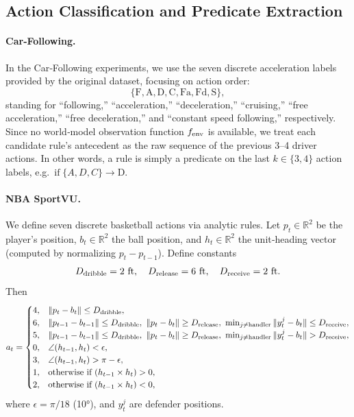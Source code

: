 \documentclass{article} %
\begin{document}
\subsection{Action Classification and Predicate Extraction}
\label{sec:action classification}
\paragraph{Car‐Following.}  
In the Car‐Following experiments, we use the seven discrete acceleration labels provided by the original dataset, focusing on action order:  
\[
\{\mathrm{F},\mathrm{A},\mathrm{D},\mathrm{C},\mathrm{Fa},\mathrm{Fd},\mathrm{S}\},
\]  
standing for “following,” “acceleration,” “deceleration,” “cruising,” “free acceleration,” “free deceleration,” and “constant speed following,” respectively.  Since no world‐model observation function \(f_{\rm env}\) is available, we treat each candidate rule’s antecedent as the raw sequence of the previous 3–4 driver actions.  In other words, a rule is simply a predicate on the last \(k\in\{3,4\}\) action labels, e.g.\ \(\mathrm{if}\;\{A,D,C\}\to\mathrm{D}\).

\paragraph{NBA SportVU.}  
We define seven discrete basketball actions via analytic rules. Let $p_t\in\mathbb R^2$ be the player’s position, $b_t\in\mathbb R^2$ the ball position, and $h_t\in\mathbb R^2$ the unit‐heading vector (computed by normalizing $p_t-p_{t-1}$). Define constants
\[
D_{\rm dribble}=2\text{ ft},\quad
D_{\rm release}=6\text{ ft},\quad
D_{\rm receive}=2\text{ ft}.
\]
Then
\[
a_t = 
\begin{cases}
4,& \|p_t - b_t\|\le D_{\rm dribble},\\
6,& \|p_{t-1}-b_{t-1}\|\le D_{\rm dribble},\ \|p_t - b_t\|\ge D_{\rm release},
      \ \min_{j\neq\text{handler}}\|y^j_t-b_t\|\le D_{\rm receive},\\
5,& \|p_{t-1}-b_{t-1}\|\le D_{\rm dribble},\ \|p_t - b_t\|\ge D_{\rm release},
      \ \min_{j\neq\text{handler}}\|y^j_t-b_t\|>D_{\rm receive},\\
0,& \angle(h_{t-1},h_t)<\epsilon,\\
3,& \angle(h_{t-1},h_t)>\pi-\epsilon,\\
1,& \text{otherwise if }(h_{t-1}\times h_t)>0,\\
2,& \text{otherwise if }(h_{t-1}\times h_t)<0,
\end{cases}
\]
where $\epsilon=\pi/18$ (10°), and $y^j_t$ are defender positions.
\end{document}
